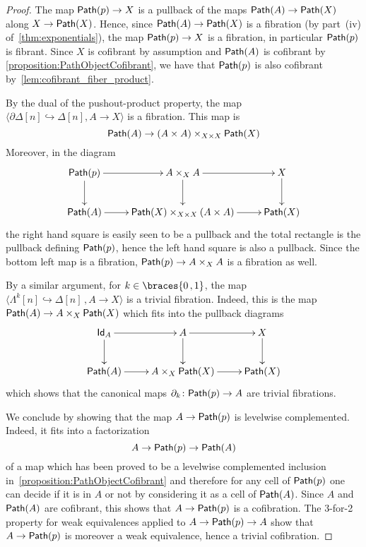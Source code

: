 \documentclass[reqno,10pt,a4paper,oneside,draft]{amsart}
\begin{document}
\begin{proof} The map $\mathsf{Path}(p) \rightarrow X$ is a pullback of the maps $\mathsf{Path}(A) \rightarrow \mathsf{Path}(X)$ along $X \rightarrow \mathsf{Path}(X)$. Hence, since $\mathsf{Path}(A) \rightarrow \mathsf{Path}(X)$ is a fibration (by part~(iv) 
of~\cref{thm:exponentials}), the map $\mathsf{Path}(p) \rightarrow X$ is a fibration, in particular $\mathsf{Path}(p)$ is fibrant. Since $X$ is cofibrant by assumption and $\mathsf{Path}(A)$ is  cofibrant by \cref{proposition:PathObjectCofibrant}, we have that $\mathsf{Path}(p)$ is also cofibrant by~\cref{lem:cofibrant_fiber_product}. 

By the dual of the pushout-product property, the map $\langle \partial \Delta[n] \hookrightarrow \Delta[n] ,  A \rightarrow X \rangle$ is a fibration. This map is 
\[ 
\mathsf{Path}(A) \rightarrow (A \times A) \times_{X \times X} \mathsf{Path}(X)
\] 
Moreover, in the diagram
\[
\xymatrix{
\Path(p) \ar[r] \ar[d] & A \times_{X} A \ar[d] \ar[r] & X \ar[d] \\
\Path(A) \ar[r] & \Path(X) \times_{X \times X}  (A \times A) \ar[r]  & \Path(X)
}
 \]
the right hand square is easily seen to be a pullback and the total rectangle is the pullback defining $\mathsf{Path}(p)$, hence the left hand square is also a pullback. Since the bottom left map is a fibration,  $\mathsf{Path}(p) \rightarrow A \times_{X} A$ is a fibration as well.

By a similar argument, for $k \in \braces{ 0 \, , 1}$, the map $\langle \Lambda^k[n] \hookrightarrow \Delta[n] \, , A \rightarrow X\rangle$ is a trivial fibration. Indeed, this is the map $\mathsf{Path}(A) \rightarrow  A  \times_X \mathsf{Path}(X)$ which fits into the pullback diagrams
\[
\xymatrix{
\Id_A \ar[r] \ar[d] & A  \ar[d] \ar[r] & X \ar[d] \\
\Path(A) \ar[r] & A \times_X \Path(X) \ar[r]  & \Path(X)
}
 \]
which  shows that the canonical maps $\partial_k \colon \mathsf{Path}(p) \rightarrow A$ are trivial fibrations.

We conclude by showing that the map $A \rightarrow \mathsf{Path}(p)$ is levelwise complemented. Indeed, it fits into a factorization 
\[
A \rightarrow \mathsf{Path}(p) \rightarrow \mathsf{Path}(A)
\] 
of a map which has been proved to be a levelwise complemented inclusion in~\cref{proposition:PathObjectCofibrant} and therefore for any cell of $\mathsf{Path}(p)$ one can decide if it is in $A$ or not by considering it as a cell of $\mathsf{Path}(A)$. Since $A$ and $\mathsf{Path}(A)$ are cofibrant, this shows that $A \rightarrow \mathsf{Path}(p)$ is a cofibration. The 3-for-2 property for weak equivalences applied to $A \rightarrow \mathsf{Path}(p) \rightarrow A$ show that  $A \rightarrow \mathsf{Path}(p)$ is moreover a weak equivalence, hence a trivial cofibration.
\end{proof}
\end{document}
